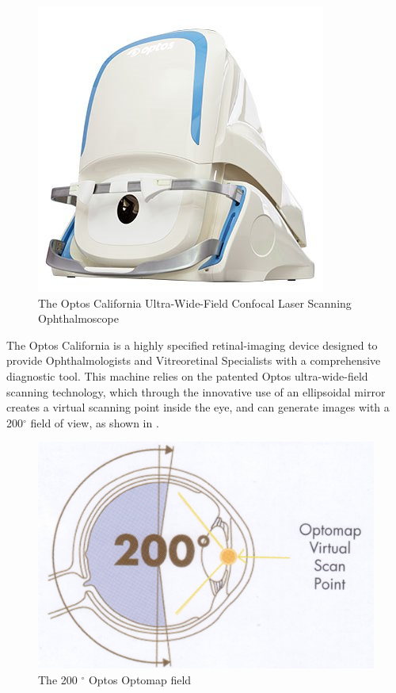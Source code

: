 \begin{figure}[htbp]
\centering
 \includegraphics{figures/california}
\caption{The Optos California Ultra-Wide-Field Confocal Laser Scanning Ophthalmoscope}
\label{fig:cali}
    \end{figure}


The Optos California is a highly specified retinal-imaging device designed to
provide Ophthalmologists and Vitreoretinal Specialists with a comprehensive
diagnostic tool. This machine relies on the patented Optos ultra-wide-field
scanning technology, which through the innovative use of an ellipsoidal mirror
creates a virtual scanning point inside the eye, and can generate images with
a 200$^\circ$ field of view, as shown in .  

\begin{figure}[htbp]
\centering
 \includegraphics{figures/optoswide}
\caption{The 200 $^\circ$ Optos Optomap field}
\label{fig:wideview}
    \end{figure}

